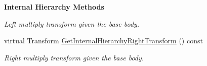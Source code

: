 \begin{Indent}{\bf Internal Hierarchy Methods}
\begin{DoxyCompactItemize}
\begin{DoxyCompactList}\small\item\em Left multiply transform given the base body. \item\end{DoxyCompactList}\item 
\hypertarget{classOpenRAVE_1_1KinBody_1_1Joint_aa648aa524fbd4802a93711d1cfff76b6}{
virtual Transform \hyperlink{classOpenRAVE_1_1KinBody_1_1Joint_aa648aa524fbd4802a93711d1cfff76b6}{GetInternalHierarchyRightTransform} () const }
\label{classOpenRAVE_1_1KinBody_1_1Joint_aa648aa524fbd4802a93711d1cfff76b6}

\begin{DoxyCompactList}\small\item\em Right multiply transform given the base body. \item\end{DoxyCompactList}\end{DoxyCompactItemize}
\end{Indent}
